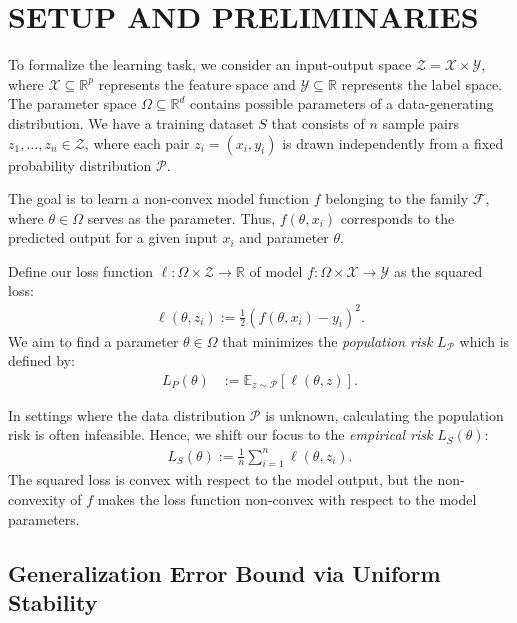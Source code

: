 \documentclass{article}
\begin{document}
\section{SETUP AND PRELIMINARIES}\label{sec:setup}

To formalize the learning task, we consider an input-output space $\mathcal{Z} = \mathcal{X} \times \mathcal{Y}$, where $\mathcal{X} \subseteq \mathbb{R}^{p}$ represents the feature space and $\mathcal{Y} \subseteq \mathbb{R}$ represents the label space. The parameter space $\Omega \subseteq \mathbb{R}^d$ contains possible parameters of a data-generating distribution. We have a training dataset $S$ that consists of $n$ sample pairs $z_1, \ldots, z_n \in \mathcal{Z}$, where each pair $z_i = (x_i, y_i)$ is drawn independently from a fixed probability distribution $\mathcal{P}$.

The goal is to learn a non-convex model function $f$ belonging to the family $\mathcal{F}$, where $\theta \in \Omega$ serves as the parameter. Thus, $f(\theta, x_i)$ corresponds to the predicted output for a given input $x_i$ and parameter $\theta$.

Define our loss function $\ell: \Omega \times \mathcal{Z} \rightarrow \mathbb{R}$ of model $f : \Omega \times \mathcal{X} \rightarrow \mathcal{Y}$ as the squared loss:
\begin{align*}
    \ell (\theta, z_i) := \frac{1}{2}(f(\theta,x_i) - y_i)^2.
\end{align*}
We aim to find a parameter $\theta \in \Omega$ that minimizes the \textit{population risk} $L_{\mathcal{P}}$ which is defined by:
\begin{align*}
    L_P(\theta)& := \mathbb{E}_{z \sim \mathcal{P}} [\ell(\theta, z)].
\end{align*}

In settings where the data distribution $\mathcal{P}$ is unknown, calculating the population risk is often infeasible. Hence, we shift our focus to the \textit{empirical risk} $L_S(\theta)$: 
\begin{align}\label{eq:squaredloss}
    L_S ( \theta) := \frac{1}{n} \sum_{i=1}^{n} \ell (\theta, z_i).
\end{align}
The squared loss is convex with respect to the model output, but the non-convexity of $f$ makes the loss function non-convex with respect to the model parameters.

\subsection{Generalization Error Bound via Uniform Stability}\label{sec:stability}
\end{document}
